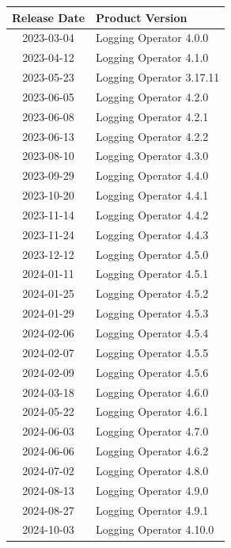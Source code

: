 \documentclass[../main.tex]{subfiles}
\begin{document}

\begin{table}[H]
    \centering
    \begin{tabular}{|c|l|}
        \hline
        \textbf{Release Date} & \textbf{Product Version} \\
        \hline
        2023-03-04 & Logging Operator 4.0.0 \\
        2023-04-12 & Logging Operator 4.1.0 \\
        2023-05-23 & Logging Operator 3.17.11 \\
        2023-06-05 & Logging Operator 4.2.0 \\
        2023-06-08 & Logging Operator 4.2.1 \\
        2023-06-13 & Logging Operator 4.2.2 \\
        2023-08-10 & Logging Operator 4.3.0 \\
        2023-09-29 & Logging Operator 4.4.0 \\
        2023-10-20 & Logging Operator 4.4.1 \\
        2023-11-14 & Logging Operator 4.4.2 \\
        2023-11-24 & Logging Operator 4.4.3 \\
        2023-12-12 & Logging Operator 4.5.0 \\
        2024-01-11 & Logging Operator 4.5.1 \\
        2024-01-25 & Logging Operator 4.5.2 \\
        2024-01-29 & Logging Operator 4.5.3 \\
        2024-02-06 & Logging Operator 4.5.4 \\
        2024-02-07 & Logging Operator 4.5.5 \\
        2024-02-09 & Logging Operator 4.5.6 \\
        2024-03-18 & Logging Operator 4.6.0 \\
        2024-05-22 & Logging Operator 4.6.1 \\
        2024-06-03 & Logging Operator 4.7.0 \\
        2024-06-06 & Logging Operator 4.6.2 \\
        2024-07-02 & Logging Operator 4.8.0 \\
        2024-08-13 & Logging Operator 4.9.0 \\
        2024-08-27 & Logging Operator 4.9.1 \\
        2024-10-03 & Logging Operator 4.10.0 \\

\end{tabular}
\end{table}
\end{document}
